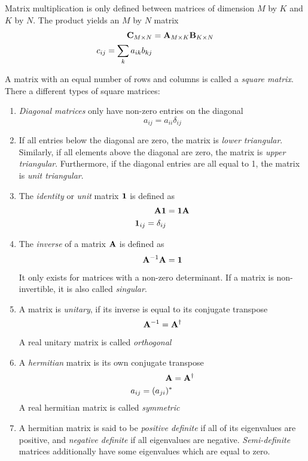Matrix multiplication is only defined between matrices of dimension $M$ by $K$ and $K$ by $N$. The product yields an $M$ by $N$ matrix
\begin{align}
\mathbf{C}_{M\times N} &= \mathbf{A}_{M\times K} \mathbf{B}_{K\times N} \\
c_{ij} = \sum_k a_{ik} b_{kj}
\end{align}

A matrix with an equal number of rows and columns is called a \emph{square matrix}. There a different types of square matrices:
\begin{enumerate}
\item \emph{Diagonal matrices} only have non-zero entries on the diagonal
\begin{equation}
a_{ij} = a_{ii} \delta_{ij}
\end{equation}

\item If all entries below the diagonal are zero, the matrix is \emph{lower triangular}. Similarly, if all elements above the diagonal are zero, the matrix is \emph{upper triangular}. Furthermore, if the diagonal entries are all equal to 1, the matrix is \emph{unit triangular}.

\item The \emph{identity} or \emph{unit} matrix $\mathbf{1}$ is defined as
\begin{align}
\mathbf{A} \mathbf{1} &= \mathbf{1} \mathbf{A} \\
\mathbf{1}_{ij} = \delta_{ij}
\end{align} 

\item The \emph{inverse} of a matrix $\mathbf{A}$ is defined as
\begin{equation}
\mathbf{A}^{-1} \mathbf{A} = \mathbf{1}
\end{equation} 
\noindent It only exists for matrices with a non-zero determinant. If a matrix is non-invertible, it is also called \emph{singular}. 

\item A matrix is \emph{unitary}, if its inverse is equal to its conjugate transpose 
\begin{equation}
\mathbf{A}^{-1} = \mathbf{A}^{\dagger}
\end{equation}
\noindent A real unitary matrix is called \emph{orthogonal}

\item A \emph{hermitian} matrix is its own conjugate transpose
\begin{align}
\mathbf{A} &= \mathbf{A}^{\dagger} \\
a_{ij} = (a_{ji})^*
\end{align}
\noindent A real hermitian matrix is called \emph{symmetric}

\item A hermitian matrix is said to be \emph{positive definite} if all of its eigenvalues are positive, and \emph{negative definite} if all eigenvalues are negative. \emph{Semi-definite} matrices additionally have some eigenvalues which are equal to zero.   
\end{enumerate}

